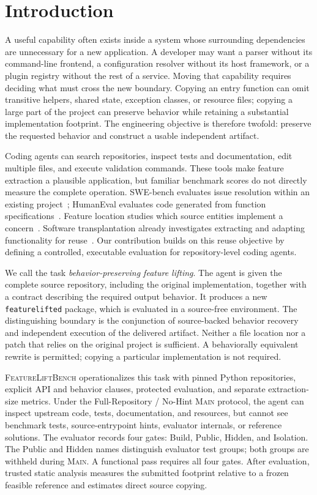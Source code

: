 \documentclass[acmsmall,screen,review,anonymous]{acmart}
\newcommand{\flb}{\textsc{FeatureLiftBench}\xspace}
\newcommand{\mainprotocol}{\textsc{Main}\xspace}
\begin{document}
\section{Introduction}
\label{sec:introduction}

A useful capability often exists inside a system whose surrounding dependencies
are unnecessary for a new application. A developer may want a parser without
its command-line frontend, a configuration resolver without its host framework,
or a plugin registry without the rest of a service. Moving that capability
requires deciding what must cross the new boundary. Copying an entry function
can omit transitive helpers, shared state, exception classes, or resource files;
copying a large part of the project can preserve behavior while retaining a
substantial implementation footprint. The engineering objective is therefore
twofold: preserve the requested behavior and construct a usable independent
artifact.

Coding agents can search repositories, inspect tests and documentation, edit
multiple files, and execute validation commands. These tools make feature
extraction a plausible application, but familiar benchmark scores do not directly
measure the complete operation. SWE-bench evaluates issue resolution within an
existing project~\cite{jimenez2024swebench}; HumanEval evaluates code generated
from function specifications~\cite{chen2021codex}. Feature location studies which
source entities implement a concern~\cite{dit2013featurelocation}. Software
transplantation already investigates extracting and adapting functionality for
reuse~\cite{barr2015transplantation}. Our contribution builds on this reuse
objective by defining a controlled, executable evaluation for repository-level
coding agents.

We call the task \emph{behavior-preserving feature lifting}. The agent is given
the complete source repository, including the original implementation, together
with a contract describing the required output behavior. It produces a new
\texttt{featurelifted} package, which is evaluated in a source-free environment.
The distinguishing boundary is the conjunction of source-backed behavior
recovery and independent execution of the delivered artifact. Neither a file
location nor a patch that relies on the original project is sufficient. A
behaviorally equivalent rewrite is permitted; copying a particular implementation
is not required.

\flb operationalizes this task with pinned Python repositories, explicit API and
behavior clauses, protected evaluation, and separate extraction-size metrics.
Under the Full-Repository / No-Hint \mainprotocol protocol, the agent can inspect
upstream code, tests, documentation, and resources, but cannot see benchmark
tests, source-entrypoint hints, evaluator internals, or reference solutions.
The evaluator records four gates: Build, Public, Hidden, and Isolation. The
Public and Hidden names distinguish evaluator test groups; both groups are
withheld during \mainprotocol. A functional pass requires all four gates.
After evaluation, trusted static analysis measures the submitted footprint
relative to a frozen feasible reference and estimates direct source copying.
\end{document}
